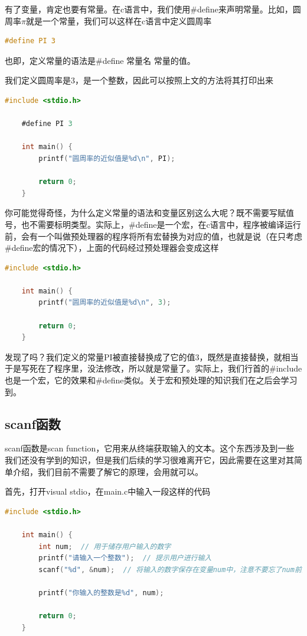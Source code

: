 有了变量，肯定也要有常量。在c语言中，我们使用\#define来声明常量。比如，圆周率$\pi$就是一个常量，我们可以这样在c语言中定义圆周率

\begin{lstlisting}[language=C]
    #define PI 3 
\end{lstlisting}

也即，定义常量的语法是\#define 常量名 常量的值。

我们定义圆周率是3，是一个整数，因此可以按照上文的方法将其打印出来

\begin{lstlisting}[language=C]
    #include <stdio.h>

    #define PI 3

    int main() {
        printf("圆周率的近似值是%d\n", PI);

        return 0;
    }
\end{lstlisting}

你可能觉得奇怪，为什么定义常量的语法和变量区别这么大呢？既不需要写赋值号，也不需要标明类型。实际上，\#define是一个宏，在c语言中，程序被编译运行前，会有一个叫做预处理器的程序将所有宏替换为对应的值，也就是说（在只考虑\#define宏的情况下），上面的代码经过预处理器会变成这样

\begin{lstlisting}[language=C]
    #include <stdio.h>

    int main() {
        printf("圆周率的近似值是%d\n", 3);

        return 0;
    }
\end{lstlisting}

发现了吗？我们定义的常量PI被直接替换成了它的值$3$，既然是直接替换，就相当于是写死在了程序里，没法修改，所以就是常量了。实际上，我们行首的\#include也是一个宏，它的效果和\#define类似。关于宏和预处理的知识我们在之后会学习到。

\subsection{scanf函数}

scanf函数是scan function，它用来从终端获取输入的文本。这个东西涉及到一些我们还没有学到的知识，但是我们后续的学习很难离开它，因此需要在这里对其简单介绍，我们目前不需要了解它的原理，会用就可以。

首先，打开visual stdio，在main.c中输入一段这样的代码

\begin{lstlisting}[language=C]
    #include <stdio.h>

    int main() {
        int num;  // 用于储存用户输入的数字
        printf("请输入一个整数");  // 提示用户进行输入
        scanf("%d", &num);  // 将输入的数字保存在变量num中，注意不要忘了num前的&

        printf("你输入的整数是%d", num);

        return 0;
    }
\end{lstlisting}

